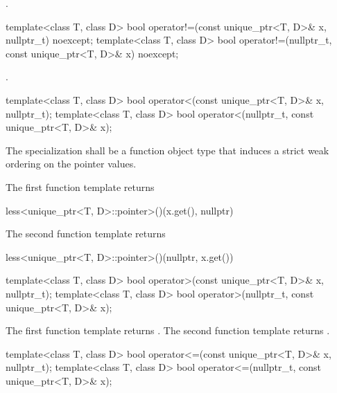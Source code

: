 \begin{itemdescr}
\pnum
\returns {}.
\end{itemdescr}

%
\begin{itemdecl}
template<class T, class D>
  bool operator!=(const unique_ptr<T, D>& x, nullptr_t) noexcept;
template<class T, class D>
  bool operator!=(nullptr_t, const unique_ptr<T, D>& x) noexcept;
\end{itemdecl}

\begin{itemdescr}
\pnum
\returns {}.
\end{itemdescr}

%
\begin{itemdecl}
template<class T, class D>
  bool operator<(const unique_ptr<T, D>& x, nullptr_t);
template<class T, class D>
  bool operator<(nullptr_t, const unique_ptr<T, D>& x);
\end{itemdecl}

\begin{itemdescr}
\pnum
\requires The specialization  shall be
a function object type that induces a strict weak
ordering on the pointer values.

\pnum
\returns
The first function template returns
\begin{codeblock}
less<unique_ptr<T, D>::pointer>()(x.get(), nullptr)
\end{codeblock}
The second function template returns
\begin{codeblock}
less<unique_ptr<T, D>::pointer>()(nullptr, x.get())
\end{codeblock}
\end{itemdescr}

%
\begin{itemdecl}
template<class T, class D>
  bool operator>(const unique_ptr<T, D>& x, nullptr_t);
template<class T, class D>
  bool operator>(nullptr_t, const unique_ptr<T, D>& x);
\end{itemdecl}

\begin{itemdescr}
\pnum
\returns
The first function template returns .
The second function template returns .
\end{itemdescr}

%
\begin{itemdecl}
template<class T, class D>
  bool operator<=(const unique_ptr<T, D>& x, nullptr_t);
template<class T, class D>
  bool operator<=(nullptr_t, const unique_ptr<T, D>& x);
\end{itemdecl}

